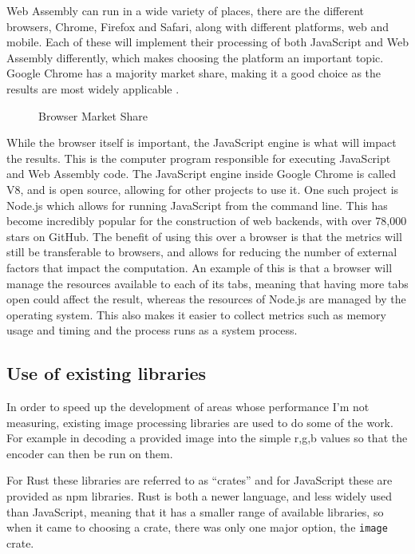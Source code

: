 \documentclass[12pt,a4paper]{article}
\begin{document}
Web Assembly can run in a wide variety of places, there are the different browsers, Chrome, Firefox and Safari, along with different platforms, web and mobile. Each of these will implement their processing of both JavaScript and Web Assembly differently, which makes choosing the platform an important topic. Google Chrome has a majority market share, making it a good choice as the results are most widely applicable \cite{webmarketshare}.
\begin{figure}[H]
    \centering
    \caption{Browser Market Share}

\end{figure}
While the browser itself is important, the JavaScript engine is what will impact the results. This is the computer program responsible for executing JavaScript and Web Assembly code. The JavaScript engine inside Google Chrome is called V8, and is open source, allowing for other projects to use it. One such project is Node.js which allows for running JavaScript from the command line. This has become incredibly popular for the construction of web backends, with over 78,000 stars on GitHub. The benefit of using this over a browser is that the metrics will still be transferable to browsers, and allows for reducing the number of external factors that impact the computation. An example of this is that a browser will manage the resources available to each of its tabs, meaning that having more tabs open could affect the result, whereas the resources of Node.js are managed by the operating system. This also makes it easier to collect metrics such as memory usage and timing and the process runs as a system process.

\subsection{Use of existing libraries}

In order to speed up the development of areas whose performance I'm not measuring, existing image processing libraries are used to do some of the work. For example in decoding a provided image into the simple r,g,b values so that the encoder can then be run on them.

For Rust these libraries are referred to as “crates” and for JavaScript these are provided as npm libraries. Rust is both a newer language, and less widely used than JavaScript, meaning that it has a smaller range of available libraries, so when it came to choosing a crate, there was only one major option, the \texttt{image} crate.
\end{document}

